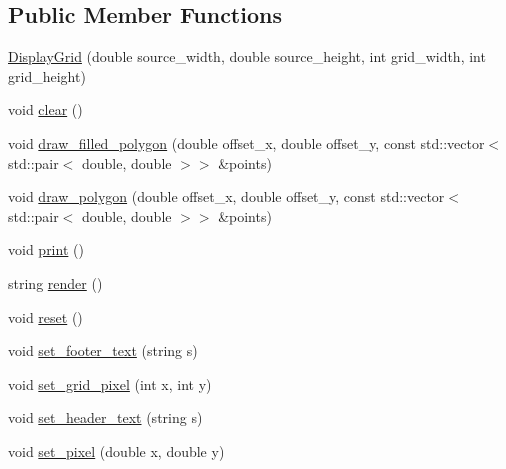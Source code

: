 \subsection*{Public Member Functions}
\begin{DoxyCompactItemize}
\item 
\hyperlink{classAsteroids_1_1UI_1_1ClientTextUI_1_1DisplayGrid_a186316077596113cfd3cbb5d0be4922e}{Display\+Grid} (double source\+\_\+width, double source\+\_\+height, int grid\+\_\+width, int grid\+\_\+height)
\item 
void \hyperlink{classAsteroids_1_1UI_1_1ClientTextUI_1_1DisplayGrid_a7e8af47380bb1c10250090b00b578227}{clear} ()
\item 
void \hyperlink{classAsteroids_1_1UI_1_1ClientTextUI_1_1DisplayGrid_a54cc7e12266f854d8047e99b7f547f22}{draw\+\_\+filled\+\_\+polygon} (double offset\+\_\+x, double offset\+\_\+y, const std\+::vector$<$ std\+::pair$<$ double, double $>$$>$ \&points)
\item 
void \hyperlink{classAsteroids_1_1UI_1_1ClientTextUI_1_1DisplayGrid_aaf3c070c4d620f5a8420e349f5501bfd}{draw\+\_\+polygon} (double offset\+\_\+x, double offset\+\_\+y, const std\+::vector$<$ std\+::pair$<$ double, double $>$$>$ \&points)
\item 
void \hyperlink{classAsteroids_1_1UI_1_1ClientTextUI_1_1DisplayGrid_a1be310d6b569c5abee1299a1a50ce7cb}{print} ()
\item 
string \hyperlink{classAsteroids_1_1UI_1_1ClientTextUI_1_1DisplayGrid_a72317ad63490f1041543c51b21da527e}{render} ()
\item 
void \hyperlink{classAsteroids_1_1UI_1_1ClientTextUI_1_1DisplayGrid_a118e0cad34b68aae5b178bd8e2b344c5}{reset} ()
\item 
void \hyperlink{classAsteroids_1_1UI_1_1ClientTextUI_1_1DisplayGrid_ae1826bd3ba813147465b5129b414feeb}{set\+\_\+footer\+\_\+text} (string s)
\item 
void \hyperlink{classAsteroids_1_1UI_1_1ClientTextUI_1_1DisplayGrid_acd82bd351302d1423b4e30f3312f7398}{set\+\_\+grid\+\_\+pixel} (int x, int y)
\item 
void \hyperlink{classAsteroids_1_1UI_1_1ClientTextUI_1_1DisplayGrid_ac9ee1a4e1b1f20e7e7c7d2ccb57ce5db}{set\+\_\+header\+\_\+text} (string s)
\item 
void \hyperlink{classAsteroids_1_1UI_1_1ClientTextUI_1_1DisplayGrid_a3f77a0874f78d753020e8ba12081bd85}{set\+\_\+pixel} (double x, double y)
\end{DoxyCompactItemize}
